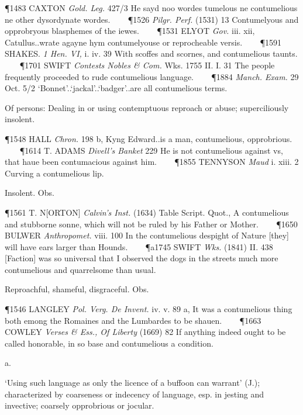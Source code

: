 \begin{description}[wide, labelwidth=!, labelindent=0pt]
\begin{myenumerate}
\P 1483 CAXTON  \textit{Gold. Leg.} 427/3 He sayd noo wordes tumelous ne contumelious ne other dysordynate wordes.    
\P 1526  \textit{Pilgr. Perf.} (1531) 13 Contumelyous and opprobryous blasphemes of the iewes.    
\P 1531 ELYOT  \textit{Gov.} iii. xii, Catullus..wrate agayne hym contumelyouse or reprocheable versis.    
\P 1591 SHAKES.  \textit{1 Hen. VI,} i. iv. 39 With scoffes and scornes, and contumelious taunts.    
\P 1701 SWIFT  \textit{Contests Nobles \& Com.} Wks. 1755 II. I. 31  The people frequently proceeded to rude contumelious language.    
\P 1884  \textit{Manch. Exam.} 29 Oct. 5/2 ‘Bonnet’..‘jackal’..‘badger’..are all contumelious terms.

 Of persons: Dealing in or using contemptuous reproach or abuse; superciliously insolent.

\P 1548 HALL  \textit{Chron.} 198 b, Kyng Edward..is a man, contumelious, opprobrious.    
\P 1614 T. ADAMS  \textit{Divell's Banket} 229 He is not contumelious against vs, that haue been contumacious against him.    
\P 1855 TENNYSON  \textit{Maud} i. xiii. 2 Curving a contumelious lip.

 Insolent. Obs.

\P 1561 T. N[ORTON]  \textit{Calvin's Inst.} (1634) Table Script. Quot., A contumelious and stubborne sonne, which will not be ruled by his Father or Mother.    
\P 1650 BULWER  \textit{Anthropomet.} viii. 100 In the contumelious despight of Nature [they] will have ears larger than Hounds.    
\P a1745 SWIFT  \textit{Wks.} (1841) II. 438 [Faction] was so universal that I observed the dogs in the streets much more contumelious and quarrelsome than usual.

 Reproachful, shameful, disgraceful. Obs.

\P 1546 LANGLEY  \textit{Pol. Verg. De Invent.} iv. v. 89 a, It was a contumelious thing both emong the Romaines and the Lumbardes to be shauen.    
\P 1663 COWLEY  \textit{Verses \& Ess., Of Liberty} (1669) 82 If anything indeed ought to be called honorable, in so base and contumelious a condition.
\end{myenumerate}


 a.

\noindent {}


\noindent ‘Using such language as only the licence of a buffoon can warrant’ (J.); characterized by coarseness or indecency of language, esp. in jesting and invective; coarsely opprobrious or jocular.


\end{description}
